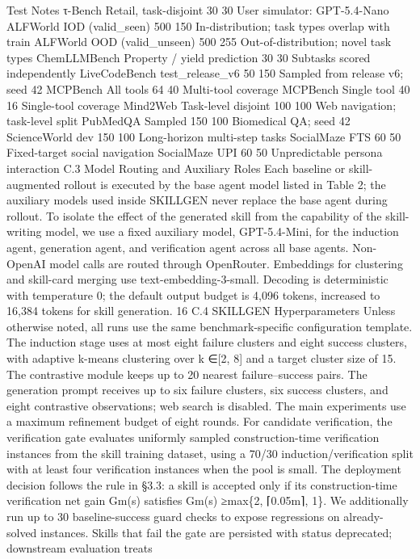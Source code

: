 Test
Notes
τ-Bench
Retail, task-disjoint
30
30
User simulator: GPT-5.4-Nano
ALFWorld
IOD (valid\_seen)
500
150
In-distribution; task types overlap
with train
ALFWorld
OOD (valid\_unseen)
500
255
Out-of-distribution; novel task
types
ChemLLMBench
Property / yield prediction
30
30
Subtasks scored independently
LiveCodeBench
test\_release\_v6
50
150
Sampled from release v6; seed 42
MCPBench
All tools
64
40
Multi-tool coverage
MCPBench
Single tool
40
16
Single-tool coverage
Mind2Web
Task-level disjoint
100
100
Web navigation; task-level split
PubMedQA
Sampled
150
100
Biomedical QA; seed 42
ScienceWorld
dev
150
100
Long-horizon multi-step tasks
SocialMaze
FTS
60
50
Fixed-target social navigation
SocialMaze
UPI
60
50
Unpredictable persona interaction
C.3
Model Routing and Auxiliary Roles
Each baseline or skill-augmented rollout is executed by the base agent model listed in Table 2; the
auxiliary models used inside SKILLGEN never replace the base agent during rollout. To isolate the
effect of the generated skill from the capability of the skill-writing model, we use a fixed auxiliary
model, GPT-5.4-Mini, for the induction agent, generation agent, and verification agent across all
base agents. Non-OpenAI model calls are routed through OpenRouter. Embeddings for clustering
and skill-card merging use text-embedding-3-small. Decoding is deterministic with temperature
0; the default output budget is 4,096 tokens, increased to 16,384 tokens for skill generation.
16
C.4
SKILLGEN Hyperparameters
Unless otherwise noted, all runs use the same benchmark-specific configuration template. The
induction stage uses at most eight failure clusters and eight success clusters, with adaptive k-means
clustering over k ∈[2, 8] and a target cluster size of 15. The contrastive module keeps up to 20
nearest failure–success pairs. The generation prompt receives up to six failure clusters, six success
clusters, and eight contrastive observations; web search is disabled.
The main experiments use a maximum refinement budget of eight rounds. For candidate verification,
the verification gate evaluates uniformly sampled construction-time verification instances from the
skill training dataset, using a 70/30 induction/verification split with at least four verification instances
when the pool is small. The deployment decision follows the rule in §3.3: a skill is accepted only
if its construction-time verification net gain Gm(s) satisfies Gm(s) ≥max\{2, ⌈0.05m⌉, 1\}. We
additionally run up to 30 baseline-success guard checks to expose regressions on already-solved
instances. Skills that fail the gate are persisted with status deprecated; downstream evaluation treats
